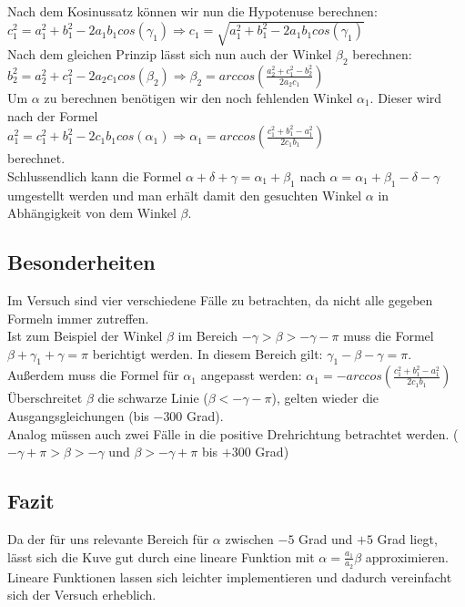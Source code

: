 Nach dem Kosinussatz können wir nun die Hypotenuse berechnen:\\ $c_1^2 = a_1^2 + b_1^2 -2a_1b_1cos(\gamma_1) \Rightarrow c_1 = \sqrt{a_1^2 + b_1^2 -2a_1b_1cos(\gamma_1)}$ \\
Nach dem gleichen Prinzip lässt sich nun auch der Winkel $\beta_2$ berechnen:\\
$b_2^2 = a_2^2 +c_1^2 - 2a_2 c_1 cos(\beta_2) \Rightarrow \beta_2 = arccos(\frac{a_2^2 + c_1^2 - b_2^2}{2a_2 c_1})$\\
Um $\alpha$ zu berechnen benötigen wir den noch fehlenden Winkel $\alpha_1$. Dieser wird nach der Formel \\
$a_1^2 = c_1^2 + b_1^2 - 2c_1 b_1 cos(\alpha_1) \Rightarrow \alpha_1 = arccos(\frac{c_1^2+b_1^2-a_1^2}{2c_1 b_1})$ \\
berechnet.\\
Schlussendlich kann die Formel $\alpha + \delta + \gamma = \alpha_1 + \beta_1$ nach $\alpha = \alpha_1 +\beta_1 - \delta - \gamma$ umgestellt werden und man erhält damit den gesuchten Winkel $\alpha$ in Abhängigkeit von dem Winkel $\beta$.

\subsection{Besonderheiten}
Im Versuch sind vier verschiedene Fälle zu betrachten, da nicht alle gegeben Formeln immer zutreffen.\\ Ist zum Beispiel der Winkel $\beta$ im Bereich $-\gamma > \beta > -\gamma -\pi$ muss die Formel $\beta + \gamma_1 + \gamma = \pi$ berichtigt werden. In diesem Bereich gilt: $\gamma_1 - \beta - \gamma = \pi$. Außerdem muss die Formel für $\alpha_1$ angepasst werden: $\alpha_1 = -arccos(\frac{c_1^2+b_1^2-a_1^2}{2c_1 b_1})$ \\
Überschreitet $\beta$ die schwarze Linie ($\beta < -\gamma - \pi$), gelten wieder die Ausgangsgleichungen (bis $-300$ Grad). \\
Analog müssen auch zwei Fälle in die positive Drehrichtung betrachtet werden. ($-\gamma + \pi > \beta > -\gamma$ und $\beta > -\gamma + \pi$ bis $+300$ Grad)

\subsection{Fazit}
Da der für uns relevante Bereich für $\alpha$ zwischen $-5$ Grad und $+5$ Grad liegt, lässt sich die Kuve gut durch eine lineare Funktion mit $\alpha = \frac{a_1}{a_2}\beta$ approximieren. Lineare Funktionen lassen sich leichter implementieren und dadurch vereinfacht sich der Versuch erheblich.

 
